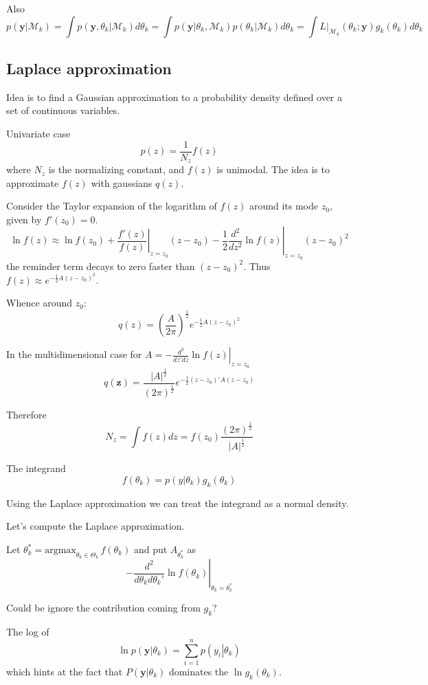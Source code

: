 \documentclass[a4paper]{article}
\newcommand{\brac}[1]{{\left ( #1 \right )}}
\newcommand{\induc}[1]{{\left . #1 \right \vert}}
\newcommand{\abs}[1]{{\left | #1 \right |}}
\newcommand{\Mcal}{\mathcal{M}}
\begin{document}
Also
\[p\brac{\induc{\mathbf{y}}\Mcal_k}
= \int p\brac{\induc{\mathbf{y}, \theta_k}\Mcal_k} d\theta_k
= \int p\brac{\induc{\mathbf{y}}\theta_k, \Mcal_k} p\brac{\induc{\theta_k}\Mcal_k}d\theta_k
= \int \induc{L}_{\Mcal_k}(\theta_k;\mathbf{y}) g_k(\theta_k) d\theta_k\]

\subsection{Laplace approximation} %
\label{sub:laplace_approximation}

Idea is to find a Gaussian approximation to a probability density defined over a set of continuous variables.

Univariate case
\[p(z) = \frac{1}{N_z}f(z)\]
where $N_z$ is the normalizing constant, and $f(z)$ is unimodal.
The idea is to approximate $f(z)$ with gaussians $q(z)$.

Consider the Taylor expansion of the logarithm of $f(z)$ around its mode $z_0$, given by $f'(z_0) = 0$.
\[\ln f(z) \approx \ln f(z_0) + \induc{\frac{f'(z)}{f(z)}}_{z=z_0} (z-z_0) - \frac{1}{2} \induc{\frac{d^2}{dz^2} \ln f(z)}_{z=z_0} \brac{z-z_0}^2 \]
the reminder term decays to zero faster than $\brac{z-z_0}^2$. Thus $f(z)\approx e^{ -\frac{1}{2} A {(z-z_0)}^2 }$.

Whence around $z_0$:
\[q(z) = \brac{\frac{A}{2\pi}}^\frac{1}{2}e^{ -\frac{1}{2} A {(z-z_0)}^2 }\]

In the multidimensional case for $A = \induc{-\frac{d^2}{dz'dz}\ln f(z)}_{z=z_0}$
\[q(\mathbf{z}) = \frac{\abs{A}^\frac{1}{2}}{{(2\pi)}^\frac{1}{2}} e^{-\frac{1}{2} (z-z_0)'A(z-z_0)}\]

Therefore
\[N_z = \int f(z) dz = f(z_0) \frac{{(2\pi)}^\frac{1}{2}}{\abs{A}^\frac{1}{2}}\]


The integrand
\[f(\theta_k) = p\brac{\induc{y}\theta_k}g_k(\theta_k)\]

Using the Laplace approximation we can treat the integrand as a normal density.

Let's compute the Laplace approximation.

Let $\theta_k^* = \text{argmax}_{\theta_k\in \Theta_k}\,f(\theta_k)$ and put $A_{\theta_k^*}$ as
\[\induc{- \frac{d^2}{d\theta_kd\theta_k'} \ln f(\theta_k)}_{\theta_k=\theta_k^*}\]

Could be ignore the contribution coming from $g_k$?

The log of
\[\ln p\brac{\induc{\mathbf{y}}\theta_k} = \sum_{i=1}^n p\brac{\induc{y_i}\theta_k}\]
which hints at the fact that $P\brac{\induc{\mathbf{y}}\theta_k}$ dominates the $\ln g_k(\theta_k)$.
\end{document}

